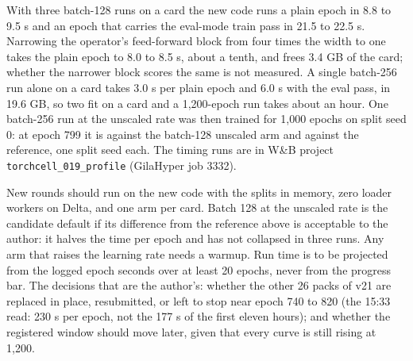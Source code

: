  With three batch-128 runs on a
card the new code runs a plain epoch in 8.8 to 9.5 s and an epoch that carries the eval-mode
train pass in 21.5 to 22.5 s. Narrowing the operator's feed-forward block from four times
the width to one takes the plain epoch to 8.0 to 8.5 s, about a tenth, and frees 3.4 GB of
the card; whether the narrower block scores the same is not measured. A single batch-256
run alone on a card takes 3.0 s per plain epoch and 6.0 s with the eval pass, in 19.6 GB,
so two fit on a card and a 1{,}200-epoch run takes about an hour. One batch-256 run at the
unscaled rate was then trained for 1{,}000 epochs on split seed 0: at epoch 799 it is
\nightBigBatchVsLrOne{} against the batch-128 unscaled arm and \nightBigBatchVsRef{} against
the reference, one split seed each.
The timing runs are in W\&B project \texttt{torchcell\_019\_profile} (GilaHyper job 3332).


 New rounds should run on the new code with the
splits in memory, zero loader workers on Delta, and one arm per card. Batch 128 at the
unscaled rate is the candidate default if its difference from the reference above is
acceptable to the author: it halves the time per epoch and has not collapsed in three runs.
Any arm that raises the learning rate needs a warmup. Run time is to be projected from the
logged epoch seconds over at least 20 epochs, never from the progress bar. The decisions
that are the author's: whether the other 26 packs of v21 are replaced in place, resubmitted,
or left to stop near epoch 740 to 820 (the 15:33 read: 230 s per epoch, not the 177 s of the first eleven hours); and whether the registered window should move later, given
that every curve is still rising at 1{,}200.

